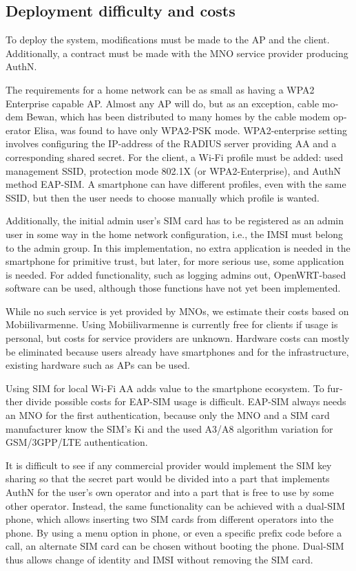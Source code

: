\documentclass[12pt,a4paper,english]{tutthesis}
\begin{document}
\begin{otherlanguage}{english}
\section{Deployment difficulty and costs}
\label{sec-6-2}

To deploy the system, modifications must be made to the AP and the client.
Additionally, a contract must be made with the MNO service
provider producing AuthN.

The requirements for a home network can be as small as having a WPA2 Enterprise capable
AP. Almost any AP will do, but as an exception, cable modem Bewan, which 
has been distributed to many homes by the cable modem operator Elisa, was found to have only WPA2-PSK mode.
WPA2-enterprise setting involves configuring the IP-address of the RADIUS server providing 
AA and a corresponding shared secret.
For  the client, a Wi-Fi profile must be added: used management SSID,
protection mode 802.1X (or WPA2-Enterprise), and AuthN method EAP-SIM.
A smartphone can have different profiles, even with the same SSID, but
then the user needs to choose manually which profile is wanted.

Additionally, the initial admin user's SIM card has to be registered as an
admin user in some way in the home network 
configuration, i.e., the IMSI must belong to the admin group.
In this implementation, no extra application is needed in the smartphone
for primitive trust, but later, for more serious use, some application is needed.
For added functionality, such as logging admins out, OpenWRT-based
software can be used, although those functions have not yet been
implemented.





While no such service is yet provided by MNOs, we estimate their costs based
on Mobiilivarmenne. Using Mobiilivarmenne is currently free for
clients if usage is personal, but costs for service providers are
unknown.  Hardware costs can mostly be eliminated because users already
have smartphones and for the infrastructure, existing hardware such as APs
can be used.

Using SIM for local Wi-Fi AA adds value to the smartphone ecosystem.
To further divide possible costs for EAP-SIM usage
is difficult.
EAP-SIM always needs an MNO for the first authentication,
because only the MNO and a SIM card manufacturer know 
the SIM's Ki and the used A3/A8 algorithm variation
for GSM/3GPP/LTE authentication.

It is difficult to see if any commercial provider would implement
the SIM key sharing so that the secret part would be divided into a part that
implements AuthN for the user's own operator and into a part that is free to
use by some other operator.  Instead, the same functionality can be achieved with
a dual-SIM phone, which allows inserting two SIM cards from different
operators into the phone. By using a menu option in phone, or even a
specific prefix code before a call, an alternate SIM card can be chosen
without booting the phone.
Dual-SIM thus allows change of identity and IMSI without removing the SIM card.


\end{otherlanguage}
\end{document}

